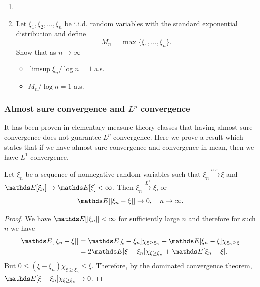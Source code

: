 \begin{exercise}
\begin{enumerate}
    \item[]
    \item Let $\xi_1, \xi_2, \dots, \xi_n$ be i.i.d. random variables with the standard exponential distribution and define
    \begin{equation*}
        M_n = \max \{\xi_1, \dots, \xi_n \}.
    \end{equation*}
    Show that as $n \to \infty$
    \begin{itemize}
        \item $\limsup \xi_n/\log{n} = 1$ a.s.
        \item $M_n / \log{n} = 1$ a.s.
    \end{itemize}
\end{enumerate}
\end{exercise}

\subsubsection{Almost sure convergence and $L^p$ convergence}
It has been proven in elementary measure theory classes that having almost sure convergence does not guarantee $L^p$ convergence. Here we prove a result which states that if we have almost sure convergence and convergence in mean, then we have $L^1$ convergence.
\begin{theorem}
Let $\xi_n$ be a sequence of nonnegative random variables such that $\xi_n \xrightarrow{a.s.} \xi$ and $\E[\xi_n] \to \E[\xi] < \infty$. Then $\xi_n \xrightarrow{L^1} \xi$, or 
\begin{equation*}
    \E[|\xi_n - \xi|] \to 0, \quad n\to \infty.
\end{equation*}
\end{theorem}

\begin{proof}
We have $\E[|\xi_n|] < \infty$ for sufficiently large $n$ and therefore for such $n$ we have
\begin{align*}
    \E[|\xi_n - \xi|] &= \E[\xi - \xi_n]\chi_{\xi \ge \xi_n} + \E[\xi_n - \xi]\chi_{\xi_n \ge \xi}\\
    &= 2 \E[\xi - \xi_n]\chi_{\xi \ge \xi_n} + \E[\xi_n - \xi].
\end{align*}
But $0 \le (\xi - \xi_n) \chi_{\xi \ge \xi_n} \le \xi$. Therefore, by the dominated convergence theorem, $\E[\xi-\xi_n] \chi_{\xi \ge \xi_n} \to 0$.
\end{proof}

